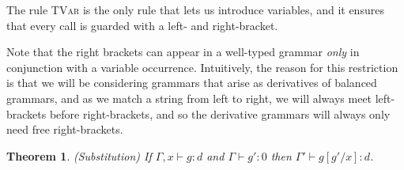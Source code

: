\documentclass{article}
\newcommand{\judgebalance}[3][\Gamma]{{#1} \vdash {#2} : {#3}}
\newtheorem{theorem}{Theorem}
\begin{document}
The rule \textsc{TVar} is the only rule that lets us introduce 
variables, and it ensures that every call is guarded with a left-
and right-bracket.  

Note that the right brackets can appear in a well-typed grammar
\emph{only} in conjunction with a variable occurrence. Intuitively,
the reason for this restriction is that we will be considering
grammars that arise as derivatives of balanced grammars, and as 
we match a string from left to right, we will always meet left-brackets
before right-brackets, and so the derivative grammars will always 
only need free right-brackets. 

\begin{theorem}{(Substitution)}
If $\judgebalance[\Gamma,x]{g}{d}$ and $\judgebalance{g'}{0}$
then $\judgebalance[\Gamma']{g[g'/x]}{d}$. 
\end{theorem}
\end{document}
